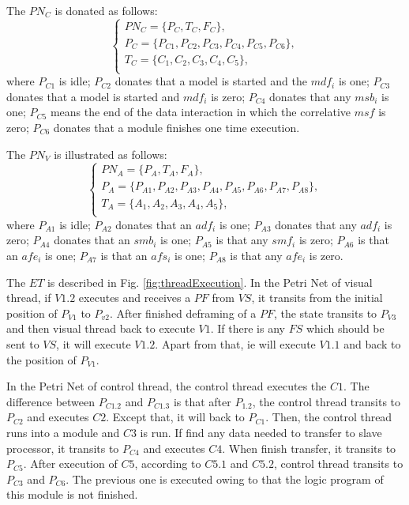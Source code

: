 \documentclass[journal,UTF8]{IEEEtran}
\begin{document}
The $PN_C$ is donated as follows:
\begin{equation}
\left\{
\begin{array}{l}
PN_C= \{P_C,T_C,F_C\},\\
P_C=\{P_{C1}, P_{C2}, P_{C3}, P_{C4}, P_{C5}, P_{C6}\},\\
T_C=\{C_1,C_2,C_3,C_4,C_5\},\\
\end{array}
\right.
\end{equation} 
where $P_{C1}$ is idle; $P_{C2}$ donates that a model is started and the $mdf_i$ is one; $P_{C3}$ donates that a model is started and $mdf_i$ is zero; $P_{C4}$ donates that any $msb_i$ is one; $P_{C5}$ means the end of the data interaction in which the  correlative $msf$ is zero; $P_{C6}$ donates that a module finishes one time execution.

The $PN_V$ is illustrated as follows:
\begin{equation}
\left\{
\begin{array}{l}
PN_A= \{P_A,T_A,F_A\},\\
P_A=\{P_{A1}, P_{A2}, P_{A3}, P_{A4}, P_{A5}, P_{A6}, P_{A7}, P_{A8}\},\\
T_A=\{A_1,A_2,A_3,A_4,A_5\},\\
\end{array}
\right.
\end{equation} 
where $P_{A1}$ is idle; $P_{A2}$ donates that an $adf_i$ is one; $P_{A3}$ donates that any $adf_i$ is zero; $P_{A4}$ donates that an $smb_i$ is one; $P_{A5}$ is that any $smf_i$ is zero; $P_{A6}$ is that an $afe_i$ is one; $P_{A7}$ is that an $afs_i$ is one; $P_{A8}$ is that any $afe_i$ is zero.   

The $ET$ is described in Fig. \ref{fig:threadExecution}. In the Petri Net of visual thread, if $V1.2$ executes and receives a $PF$ from $VS$, it transits from the initial position of $P_{V1}$ to $P_{v2}$. After finished deframing of a $PF$, the state transits to $P_{V3}$ and then visual thread back to execute $V1$. If there is any $FS$ which should be sent to $VS$, it will execute $V1.2$. Apart from that, ie will execute $V1.1$ and back to the position of $P_{V1}$.

In the Petri Net of control thread, the control thread executes the $C1$. The difference between $P_{C1.2}$ and $P_{C1.3}$ is that after $P_{1.2}$, the control thread transits to $P_{C2}$ and executes $C2$. Except that, it will back to $P_{C1}$. Then, the control thread runs into a module and $C3$ is run. If find any data needed to transfer to slave processor, it transits to $P_{C4}$ and executes $C4$. When finish transfer, it transits to $P_{C5}$. After execution of $C5$, according to $C5.1$ and $C5.2$, control thread transits to $P_{C3}$ and $P_{C6}$. The previous one is executed owing to that the logic program of this module is not finished.
\end{document}
